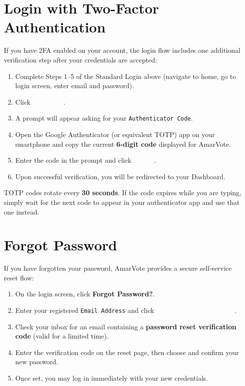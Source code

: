 \documentclass[12pt,a4paper,openany]{book}
\newcommand{\uibutton}[1]{\colorbox{primaryblue}{\textcolor{white}{\small\textbf{#1}}}}
\newcommand{\uifield}[1]{\texttt{\color{accentteal}#1}}
\newcommand{\uimenu}[1]{\textbf{\color{primaryblue}#1}}
\begin{document}
\section{Login with Two-Factor Authentication}

If you have 2FA enabled on your account, the login flow includes one additional verification step after your credentials are accepted:

\begin{enumerate}
	\item Complete Steps 1--5 of the Standard Login above (navigate to home, go to login screen, enter email and password).
	\item Click \uibutton{Continue}.
	\item A prompt will appear asking for your \uifield{Authenticator Code}.
	\item Open the Google Authenticator (or equivalent TOTP) app on your smartphone and copy the current \textbf{6-digit code} displayed for AmarVote.
	\item Enter the code in the prompt and click \uibutton{Verify}.
	\item Upon successful verification, you will be redirected to your Dashboard.
\end{enumerate}

\begin{tcolorbox}[notebox]
	TOTP codes rotate every \textbf{30 seconds}. If the code expires while you are typing, simply wait for the next code to appear in your authenticator app and use that one instead.
\end{tcolorbox}

\section{Forgot Password}

If you have forgotten your password, AmarVote provides a secure self-service reset flow:

\begin{enumerate}
	\item On the login screen, click \uimenu{Forgot Password?}.
	\item Enter your registered \uifield{Email Address} and click \uibutton{Send Verification Code}.
	\item Check your inbox for an email containing a \textbf{password reset verification code} (valid for a limited time).
	\item Enter the verification code on the reset page, then choose and confirm your new password.
	\item Once set, you may log in immediately with your new credentials.
\end{enumerate}
\end{document}
